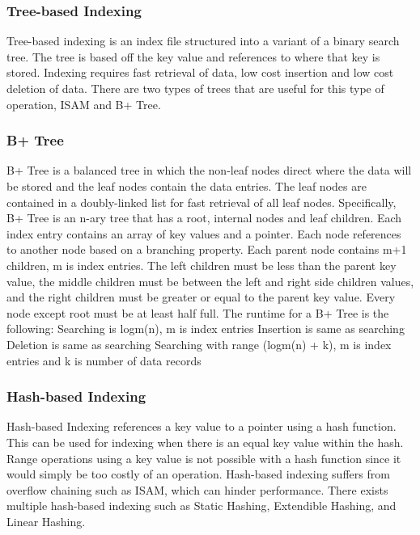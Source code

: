 \documentclass[letterpaper]{article}
\begin{document}
\subsubsection{Tree-based Indexing}
Tree-based indexing is an index file structured into a variant of a binary search tree. The tree is based off the key value and references to where that key is stored. Indexing requires fast retrieval of data, low cost insertion and low cost deletion of data. There are two types of trees that are useful for this type of operation, ISAM and B+ Tree.

\subsubsection{B+ Tree}
B+ Tree is a balanced tree in which the non-leaf nodes direct where the data will be stored and the leaf nodes contain the data entries. The leaf nodes are contained in a doubly-linked list for fast retrieval of all leaf nodes.
Specifically, B+ Tree is an n-ary tree that has a root, internal nodes and leaf children. Each index entry contains an array of key values and a pointer. Each node references to another node based on a branching property. Each parent node contains m+1 children, m is index entries. The left children must be less than the parent key value, the middle children must be between the left and right side children values, and the right children must be greater or equal to the parent key value. Every node except root must be at least half full. 
The runtime for a B+ Tree is the following:
Searching is logm(n), m is index entries
Insertion is same as searching
Deletion is same as searching
Searching with range (logm(n) + k), m is index entries and k is number of data records

\subsubsection{Hash-based Indexing}
	Hash-based Indexing references a key value to a pointer using a hash function. This can be used for indexing when there is an equal key value within the hash. Range operations using a key value is not possible with a hash function since it would simply be too costly of an operation. Hash-based indexing suffers from overflow chaining such as ISAM, which can hinder performance. There exists multiple hash-based indexing such as Static Hashing, Extendible Hashing, and Linear Hashing. 
\end{document}
